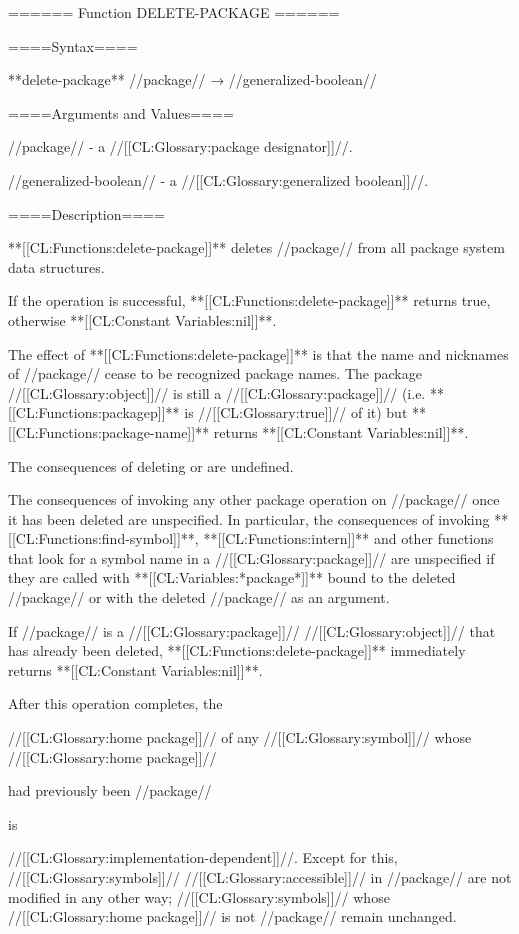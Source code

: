 ====== Function DELETE-PACKAGE ======

====Syntax====

**delete-package** //package// → //generalized-boolean//

====Arguments and Values====

//package// - a //[[CL:Glossary:package designator]]//.

//generalized-boolean// - a //[[CL:Glossary:generalized boolean]]//.

====Description====

**[[CL:Functions:delete-package]]** deletes //package// from all package system data structures.

If the operation is successful, **[[CL:Functions:delete-package]]** returns true, otherwise **[[CL:Constant Variables:nil]]**.

The effect of **[[CL:Functions:delete-package]]** is that the name and nicknames of //package// cease to be recognized package names. The package //[[CL:Glossary:object]]// is still a //[[CL:Glossary:package]]// (i.e. **[[CL:Functions:packagep]]** is //[[CL:Glossary:true]]// of it) but **[[CL:Functions:package-name]]** returns **[[CL:Constant Variables:nil]]**.

The consequences of deleting  or  are undefined.

The consequences of invoking any other package operation on //package// once it has been deleted are unspecified. In particular, the consequences of invoking **[[CL:Functions:find-symbol]]**, **[[CL:Functions:intern]]** and other functions that look for a symbol name in a //[[CL:Glossary:package]]// are unspecified if they are called with **[[CL:Variables:*package*]]** bound to the deleted //package// or with the deleted //package// as an argument.

If //package// is a //[[CL:Glossary:package]]// //[[CL:Glossary:object]]// that has already been deleted, **[[CL:Functions:delete-package]]** immediately returns **[[CL:Constant Variables:nil]]**.

After this operation completes, the

//[[CL:Glossary:home package]]// of any //[[CL:Glossary:symbol]]// whose //[[CL:Glossary:home package]]//

had previously been //package//

is

//[[CL:Glossary:implementation-dependent]]//. Except for this, //[[CL:Glossary:symbols]]// //[[CL:Glossary:accessible]]// in //package// are not modified in any other way; //[[CL:Glossary:symbols]]// whose //[[CL:Glossary:home package]]// is not //package// remain unchanged.


